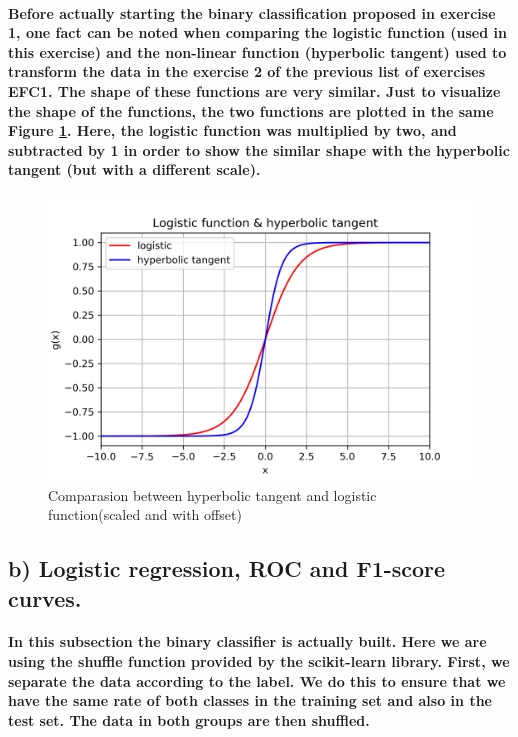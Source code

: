 \documentclass[a4paper]{article}
\begin{document}
\paragraph{Before actually starting the binary classification proposed in exercise 1, one fact can be noted when comparing the logistic function (used in this exercise) and the non-linear function (hyperbolic tangent) used to transform the data in the exercise 2 of the previous list of exercises EFC1. The shape of these functions are very similar. Just to visualize the shape of the functions, the two functions are plotted in the same Figure \ref{fig:pre-ex1-logistic_tanh}. Here, the logistic function was multiplied by two, and subtracted by 1 in order to show the similar shape with the hyperbolic tangent (but with a different scale).}

\begin{figure}[H]
    \centering
    \includegraphics[width=12cm]{logistic_vs_tanh}
    \caption{Comparasion between hyperbolic tangent and logistic function(scaled and with offset)}
    \label{fig:pre-ex1-logistic_tanh}
\end{figure}

\subsection{b) Logistic regression, ROC and F1-score curves.}

\paragraph{In this subsection the binary classifier is actually built. Here we are using the shuffle function provided by the scikit-learn library. First, we separate the data according to the label. We do this to ensure that we have the same rate of both classes in the training set and also in the test set. The data in both groups are then shuffled.}
\end{document}

